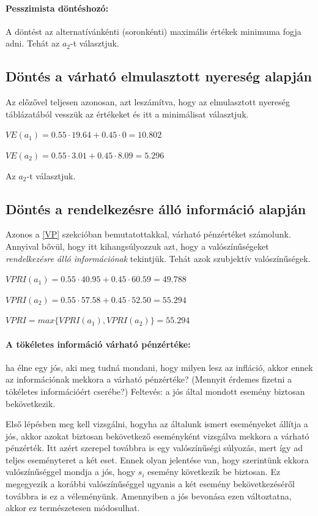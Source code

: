 \documentclass[a4paper,12pt]{article}
\begin{document}
\paragraph{Pesszimista döntéshozó:} A döntést az alternatívánkénti (soronkénti) maximális értékek minimuma fogja adni. Tehát az $a_2$-t választjuk.

\subsection{Döntés a várható elmulasztott nyereség alapján}
Az előzővel teljesen azonosan, azt leszámítva, hogy az elmulasztott nyereség táblázatából vesszük az értékeket és itt a minimálisat választjuk.

$VE(a_1) = 0.55\cdot 19.64 + 0.45\cdot 0 = 10.802$

$VE(a_2) = 0.55\cdot 3.01 + 0.45\cdot 8.09 = 5.296$

Az $a_2$-t választjuk.

\subsection{Döntés a rendelkezésre álló információ alapján}
Azonos a \ref{VP} szekcióban bemutatottakkal, várható pénzértéket számolunk. Annyival bővül, hogy itt kihangsúlyozzuk azt, hogy a valószínűségeket \emph{rendelkezésre álló információnak} tekintjük. Tehát azok szubjektív valószínűségek.

$VPRI(a_1) = 0.55\cdot 40.95 + 0.45\cdot 60.59 = 49.788$

$VPRI(a_2) = 0.55\cdot 57.58 + 0.45\cdot 52.50 = 55.294$

$VPRI = max\{VPRI(a_1), VPRI(a_2)\} = 55.294$

\paragraph{A tökéletes információ várható pénzértéke: } ha élne egy jós, aki meg tudná mondani, hogy milyen lesz az infláció, %
akkor ennek az információnak mekkora a várható pénzértéke?
(Mennyit érdemes fizetni a tökéletes információért cserébe?)
Feltevés: a jós által mondott esemény biztosan bekövetkezik.

Első lépésben meg kell vizsgálni, hogyha az általunk ismert eseményeket állítja a jós, akkor azokat biztosan bekövetkező eseményként vizsgálva mekkora a várható pénzérték.
Itt azért szerepel továbbra is egy valószínűségi súlyozás, mert így ad teljes eseményteret a két eset. Ennek olyan jelentése van, hogy szerintünk ekkora valószínűséggel mondja a jós, hogy $s_{i}$ esemény következik be biztosan. Ez megegyezik a korábbi valószínűséggel ugyanis a két esemény bekövetkezéséről továbbra is ez a véleményünk. Amennyiben a jós bevonása ezen változtatna, akkor ez természetesen módosulhat.
\end{document}

